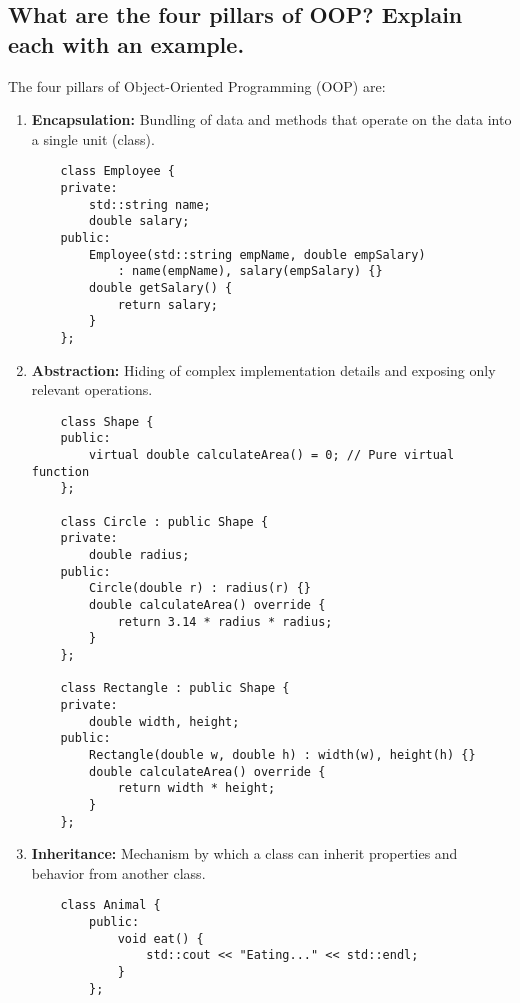 \subsection{What are the four pillars of OOP? Explain each with an example.}
The four pillars of Object-Oriented Programming (OOP) are:
\begin{enumerate}
    \item \textbf{Encapsulation:} Bundling of data and methods that operate on the data into a single unit (class).
    \begin{tcolorbox}[title=Example of Encapsulation]
    \begin{verbatim}
    class Employee {
    private:
        std::string name;
        double salary;
    public:
        Employee(std::string empName, double empSalary) 
            : name(empName), salary(empSalary) {}
        double getSalary() {
            return salary;
        }
    };
    \end{verbatim}
    \end{tcolorbox}
    \item \textbf{Abstraction:} Hiding of complex implementation details and exposing only relevant operations.
    \begin{tcolorbox}[title=Example of Abstraction]
    \begin{verbatim}
    class Shape {
    public:
        virtual double calculateArea() = 0; // Pure virtual function
    };
    
    class Circle : public Shape {
    private:
        double radius;
    public:
        Circle(double r) : radius(r) {}
        double calculateArea() override {
            return 3.14 * radius * radius;
        }
    };
    
    class Rectangle : public Shape {
    private:
        double width, height;
    public:
        Rectangle(double w, double h) : width(w), height(h) {}
        double calculateArea() override {
            return width * height;
        }
    };
    \end{verbatim}
    \end{tcolorbox}
    \item \textbf{Inheritance:} Mechanism by which a class can inherit properties and behavior from another class.
    \begin{tcolorbox}[title=Example of Inheritance]
    \begin{verbatim}
    class Animal {
        public:
            void eat() {
                std::cout << "Eating..." << std::endl;
            }
        };
        

\end{verbatim}
\end{tcolorbox}
\end{enumerate}
